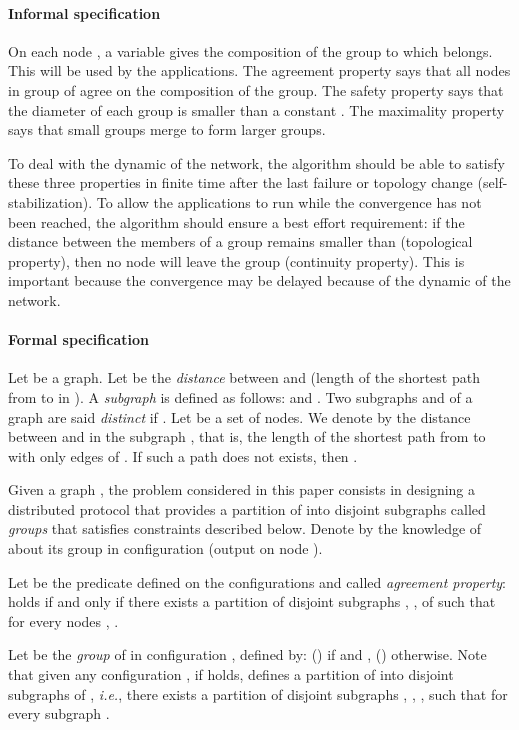 \documentclass[11pt,english]{article}
\begin{document}
\paragraph{Informal specification} On each node , a variable
 gives the composition of the group to which  belongs. This
will be used by the applications. The agreement property says that all nodes in
group of  agree on the composition of the group. The safety property says
that the diameter of each group is smaller than a constant . The
maximality property says that small groups merge to form larger groups.

To deal with the dynamic of the network, the algorithm should be able to satisfy
these three properties in finite time after the last failure or topology change
(self-stabilization). To allow the applications to run while the convergence has
not been reached, the algorithm should ensure a best effort requirement: if the
distance between the members of a group remains smaller than 
(topological property), then no node will leave the group (continuity
property). This is important because the convergence may be delayed because of
the dynamic of the network.

\paragraph{Formal specification}
Let  be a graph.  Let  be the \emph{distance} between  and
 (length of the shortest path from  to  in ).
A \emph{subgraph}  is defined as follows:  and
.
Two subgraphs  and  of a graph  are said
\emph{distinct} if .
Let  be a set of nodes. We denote by  the distance
between  and  in the subgraph , that is, the length of the
shortest path from  to  with only edges of . If such a path does not
exists, then .

Given a graph , the problem considered in this paper consists in designing a
distributed protocol that provides a partition of  into disjoint subgraphs
called {\em groups} that satisfies constraints described
below.  Denote by  the knowledge of  about its group in
configuration  (output on node ).

Let  be the predicate defined on the configurations and called
\emph{agreement property}:  holds if and only if there exists a
partition of disjoint subgraphs ,  , 
 of  such that for every nodes , .


Let  be the \emph{group} of  in configuration , defined by:
()  if  and , ()  otherwise.  Note that given any configuration , if  holds,
 defines a partition of  into disjoint subgraphs of
, {\it i.e.}, there exists a partition of disjoint subgraphs ,
, ,  such that  for every subgraph . 
\end{document}
